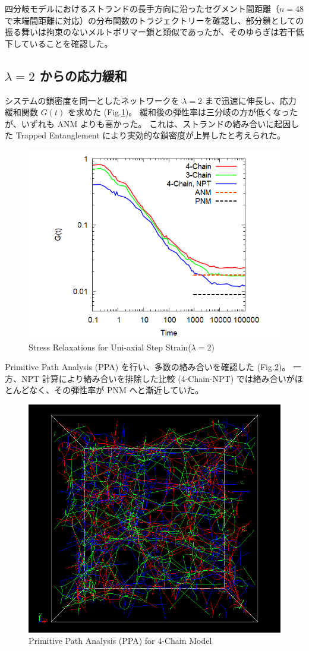 \documentclass[uplatex,10pt,a4paper,twocolumn]{jsarticle}
\begin{document}
    四分岐モデルにおけるストランドの長手方向に沿ったセグメント間距離（$n=48$ で末端間距離に対応）の分布関数のトラジェクトリーを確認し、部分鎖としての振る舞いは拘束のないメルトポリマー鎖と類似であったが、そのゆらぎは若干低下していることを確認した。
    

    \subsection{$\lambda =2$ からの応力緩和}
    システムの鎖密度を同一としたネットワークを $\lambda =2$ まで迅速に伸長し、応力緩和関数 $G(t)$ を求めた (Fig.\ref{fig:stress_rel})。
    緩和後の弾性率は三分岐の方が低くなったが、いずれも ANM よりも高かった。
    これは、ストランドの絡み合いに起因した Trapped Entanglement により実効的な鎖密度が上昇したと考えられた。

    \begin{figure}[htb]
    \centering
        \includegraphics[width=.42\textwidth]{gt_comp_34.png}
    \caption{Stress Relaxations for Uni-axial Step Strain($\lambda=2$)}
    \label{fig:stress_rel}
    \end{figure}

    Primitive Path Analysis (PPA) を行い、多数の絡み合いを確認した (Fig.\ref{fig:ppa})。
    一方、NPT 計算により絡み合いを排除した比較 (4-Chain-NPT) では絡み合いがほとんどなく、その弾性率が PNM へと漸近していた。
    
    \begin{figure}[htb]
    \centering
        \includegraphics[width=.34\textwidth]{N48_f4_PPA.png}
    \caption{Primitive Path Analysis (PPA) for 4-Chain Model}
    \label{fig:ppa}
    \end{figure}
\end{document}
